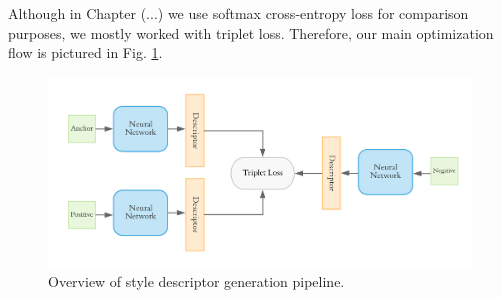 Although in Chapter (...) we use softmax cross-entropy loss for comparison purposes, we mostly worked with triplet loss.  Therefore, our main optimization flow is pictured in Fig. \ref{fig:triplet_overall}.

\begin{figure}[ht]
	\centering
	\includegraphics[width=\linewidth]{imgs/triplet_loss_architecture.pdf}
	\caption{Overview of style descriptor generation pipeline.}
	\label{fig:triplet_overall}
\end{figure}